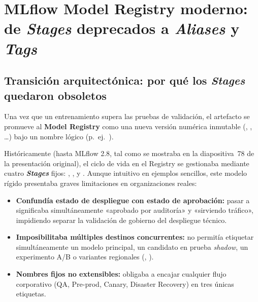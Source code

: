 \section[Model Registry: Aliases y Tags]{MLflow Model Registry moderno: de \textit{Stages} deprecados a \textit{Aliases} y \textit{Tags}}\label{sec:mlflow-registry}

\subsection{Transición arquitectónica: por qué los \textit{Stages} quedaron obsoletos}

Una vez que un entrenamiento supera las pruebas de validación, el artefacto se promueve al \textbf{Model Registry} como una nueva versión numérica inmutable (, , \dots) bajo un nombre lógico (p.~ej.\ ).

Históricamente (hasta MLflow 2.8, tal como se mostraba en la diapositiva~78 de la presentación original), el ciclo de vida en el Registry se gestionaba mediante cuatro \textbf{\textit{Stages}} fijos: , ,  y . Aunque intuitivo en ejemplos sencillos, este modelo rígido presentaba graves limitaciones en organizaciones reales:
\begin{itemize}
  \item \textbf{Confundía estado de despliegue con estado de aprobación:} pasar a  significaba simultáneamente «aprobado por auditoría» y «sirviendo tráfico», impidiendo separar la validación de gobierno del despliegue técnico.
  \item \textbf{Imposibilitaba múltiples destinos concurrentes:} no permitía etiquetar simultáneamente un modelo principal, un candidato en prueba \textit{shadow}, un experimento A/B o variantes regionales (, ).
  \item \textbf{Nombres fijos no extensibles:} obligaba a encajar cualquier flujo corporativo (QA, Pre-prod, Canary, Disaster Recovery) en tres únicas etiquetas.
\end{itemize}

